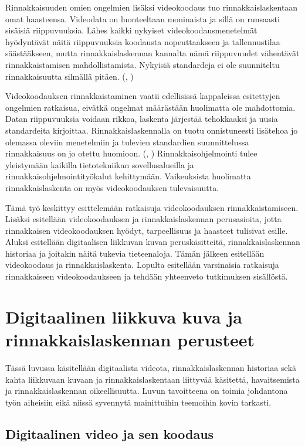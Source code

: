 Rinnakkaisuuden omien ongelmien lisäksi videokoodaus tuo rinnakkaislaskentaan
omat haasteensa. Videodata on luonteeltaan moninaista ja sillä on runsaasti
sisäisiä riippuvuuksia. Lähes kaikki nykyiset videokoodausmenetelmät
hyödyntävät näitä riippuvuuksia koodausta nopeuttaakseen ja tallennustilaa
säästääkseen, mutta rinnakkaislaskennan kannalta nämä riippuvuudet vähentävät
rinnakkaistamisen mahdollistamista. Nykyisiä standardeja ei ole suunniteltu
rinnakkaisuutta silmällä pitäen. (\citealt{pieters}, \citealt{xu})

Videokoodauksen rinnakkaistaminen vaatii edellisissä kappaleissa esitettyjen
ongelmien ratkaisua, eivätkä ongelmat määrästään huolimatta ole mahdottomia.
Datan riippuvuuksia voidaan rikkoa, laskenta järjestää tehokkaaksi ja uusia
standardeita kirjoittaa. Rinnakkaislaskennalla on tuotu onnistuneesti lisätehoa
jo olemassa oleviin menetelmiin ja tulevien standardien suunnittelussa
rinnakkaisuus on jo otettu huomioon. (\citealt{li}, \citealt{chi})
Rinnakkaisohjelmointi tulee yleistymään kaikilla tietotekniikan
sovellusalueilla ja rinnakkaisohjelmointityökalut kehittymään. Vaikeuksista
huolimatta rinnakkaislaskenta on myös videokoodauksen tulevaisuutta.

Tämä työ keskittyy esittelemään ratkaisuja videokoodauksen rinnakkaistamiseen.
Lisäksi esitellään videokoodauksen ja rinnakkaislaskennan perusasioita, jotta
rinnakkaisen videokoodauksen hyödyt, tarpeellisuus ja haasteet tulisivat
esille. Aluksi esitellään digitaalisen liikkuvan kuvan peruskäsitteitä,
rinnakkaislaskennan historiaa ja joitakin näitä tukevia tieteenaloja. Tämän
jälkeen esitellään videokoodaus ja rinnakkaislaskenta. Lopulta esitellään
varsinaisia ratkaisuja rinnakkaiseen videokoodaukseen ja tehdään yhteenveto
tutkimuksen sisällöstä.

\section{Digitaalinen liikkuva kuva ja rinnakkaislaskennan perusteet}

Tässä luvussa käsitellään digitaalista videota, rinnakkaislaskennan historiaa
sekä kahta liikkuvaan kuvaan ja rinnakkaislaskentaan liittyvää käsitettä,
havaitsemista ja rinnakkaislaskennan oikeellisuutta. Luvun tavoitteena on
toimia johdantona työn aiheisiin eikä niissä syvennytä mainittuihin teemoihin
kovin tarkasti.

\subsection{Digitaalinen video ja sen koodaus}

